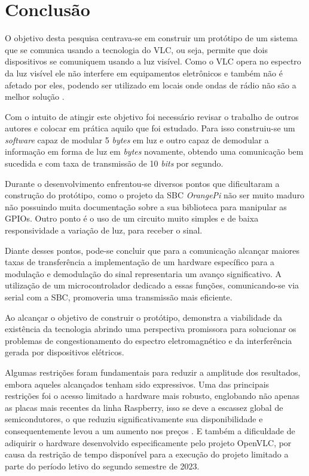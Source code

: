 \section{Conclusão}

O objetivo desta pesquisa centrava-se em construir um protótipo de um sistema que se comunica usando a tecnologia do VLC, ou seja, permite que dois dispositivos se comuniquem usando a luz visível. Como o VLC opera no espectro da luz visível ele não interfere em equipamentos eletrônicos e também não é afetado por eles, podendo ser utilizado em locais onde ondas de rádio não são a melhor solução \cite{matheus2017comunicaccao}.

Com o intuito de atingir este objetivo foi necessário revisar o trabalho de outros autores e colocar em prática aquilo que foi estudado. Para isso construiu-se um \textit{software} capaz de modular 5 \textit{bytes} em luz e outro capaz de demodular a informação em forma de luz em \textit{bytes} novamente, obtendo uma comunicação bem sucedida e com taxa de transmissão de 10 \textit{bits} por segundo.

Durante o desenvolvimento enfrentou-se diversos pontos que dificultaram a construção do protótipo, como o projeto da SBC \textit{OrangePi} não ser muito maduro não possuindo muita documentação sobre a sua biblioteca para manipular as GPIOs. Outro ponto é o uso de um circuito muito simples e de baixa responsividade a variação de luz, para receber o sinal.

Diante desses pontos, pode-se concluir que para a comunicação alcançar maiores taxas de transferência a implementação de um hardware específico para a modulação e demodulação do sinal representaria um avanço significativo. A utilização de um microcontrolador dedicado a essas funções, comunicando-se via serial com a SBC, promoveria uma transmissão mais eficiente.

Ao alcançar o objetivo de construir o protótipo, demonstra a viabilidade da existência da tecnologia abrindo uma perspectiva promissora para solucionar os problemas de congestionamento do espectro eletromagnético e da interferência gerada por dispositivos elétricos. 

Algumas restrições foram fundamentais para reduzir a amplitude dos resultados, embora aqueles alcançados tenham sido expressivos. Uma das principais restrições foi o acesso limitado a hardware mais robusto, englobando não apenas as placas mais recentes da linha Raspberry, isso se deve a escassez global de semicondutores, o que reduziu significativamente sua disponibilidade e consequentemente levou a um aumento nos preços \cite{zeng_2022}. E também a dificuldade de adiquirir o hardware desenvolvido especificamente pelo projeto OpenVLC, por causa da restrição de tempo disponível para a execução do projeto limitado a parte do período letivo do segundo semestre de 2023.
